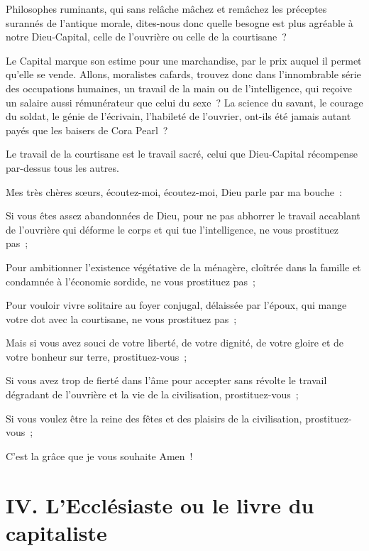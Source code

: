 \documentclass[french,twoside]{book} %
\newcommand\chapteropen{} %
\newcommand\chapterclose{} %
\begin{document}
Philosophes ruminants, qui sans relâche mâchez et remâchez les préceptes surannés de l’antique morale, dites-nous donc quelle besogne est plus agréable à notre Dieu-Capital, celle de l’ouvrière ou celle de la courtisane ?\par
Le Capital marque son estime pour une marchandise, par le prix auquel il permet qu’elle se vende. Allons, moralistes cafards, trouvez donc dans l’innombrable série des occupations humaines, un travail de la main ou de l’intelligence, qui reçoive un salaire aussi rémunérateur que celui du sexe ? La science du savant, le courage du soldat, le génie de l’écrivain, l’habileté de l’ouvrier, ont-ils été jamais autant payés que les baisers de Cora Pearl ?\par
Le travail de la courtisane est le travail sacré, celui que Dieu-Capital récompense par-dessus tous les autres.\par
Mes très chères sœurs, écoutez-moi, écoutez-moi, Dieu parle par ma bouche :\par
Si vous êtes assez abandonnées de Dieu, pour ne pas abhorrer le travail accablant de l’ouvrière qui déforme le corps et qui tue l’intelligence, ne vous prostituez pas ;\par
Pour ambitionner l’existence végétative de la ménagère, cloîtrée dans la famille et condamnée à l’économie sordide, ne vous prostituez pas ;\par
Pour vouloir vivre solitaire au foyer conjugal, délaissée par l’époux, qui mange votre dot avec la courtisane, ne vous prostituez pas ;\par
Mais si vous avez souci de votre liberté, de votre dignité, de votre gloire et de votre bonheur sur terre, prostituez-vous ;\par
Si vous avez trop de fierté dans l’âme pour accepter sans révolte le travail dégradant de l’ouvrière et la vie de la civilisation, prostituez-vous ;\par
Si vous voulez être la reine des fêtes et des plaisirs de la civilisation, prostituez-vous ;\par
C'est la grâce que je vous souhaite Amen !
\chapterclose


\chapteropen

\chapter[{IV. L'Ecclésiaste ou le livre du capitaliste}]{IV. L'Ecclésiaste ou le livre du capitaliste}
\renewcommand{\leftmark}{IV. L'Ecclésiaste ou le livre du capitaliste}
\end{document}
